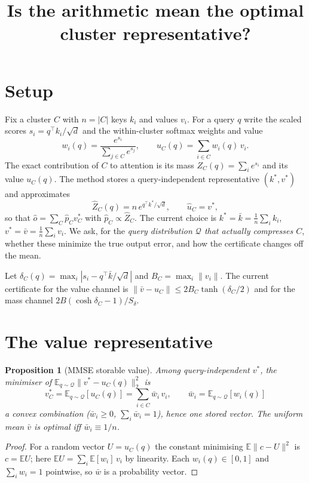 \documentclass[11pt]{article}
\title{Is the arithmetic mean the optimal cluster representative?}
\author{}
\date{}
\newtheorem{proposition}{Proposition}
\begin{document}
\maketitle

\section{Setup}

Fix a cluster $C$ with $n=|C|$ keys $k_i$ and values $v_i$. For a query $q$ write the
scaled scores $s_i = q^\top k_i/\sqrt{d}$ and the within-cluster softmax weights and
value
\[
  w_i(q) = \frac{e^{s_i}}{\sum_{j\in C} e^{s_j}}, \qquad
  u_C(q) = \sum_{i\in C} w_i(q)\, v_i .
\]
The exact contribution of $C$ to attention is its mass $Z_C(q)=\sum_i e^{s_i}$ and its
value $u_C(q)$. The method stores a query-independent representative $(k^\ast,v^\ast)$ and
approximates
\[
  \hat Z_C(q) = n\, e^{q^\top k^\ast/\sqrt d}, \qquad \hat u_C = v^\ast,
\]
so that $\hat o = \sum_C \hat p_C v^\ast_C$ with $\hat p_C \propto \hat Z_C$. The current
choice is $k^\ast=\bar k=\frac1n\sum_i k_i$, $v^\ast=\bar v=\frac1n\sum_i v_i$. We ask,
for the \emph{query distribution $\mathcal Q$ that actually compresses $C$}, whether these
minimize the true output error, and how the certificate changes off the mean.

Let $\delta_C(q) = \max_i |s_i - q^\top\bar k/\sqrt d|$ and $B_C=\max_i\|v_i\|$. The
current certificate for the value channel is $\|\bar v - u_C\|\le 2B_C\tanh(\delta_C/2)$
and for the mass channel $2B(\cosh\delta_C-1)/S_\delta$.

\section{The value representative}

\begin{proposition}[MMSE storable value]\label{prop:value}
Among query-independent $v^\ast$, the minimiser of $\mathbb E_{q\sim\mathcal Q}\|v^\ast-u_C(q)\|_2^2$ is
\[
  \boxed{\;v^\ast_C = \mathbb E_{q\sim\mathcal Q}[u_C(q)] = \sum_{i\in C}\bar w_i\, v_i,\qquad
  \bar w_i = \mathbb E_{q\sim\mathcal Q}[w_i(q)]\;}
\]
a convex combination ($\bar w_i\ge0$, $\sum_i\bar w_i=1$), hence one stored vector. The
uniform mean $\bar v$ is optimal iff $\bar w_i\equiv 1/n$.
\end{proposition}
\begin{proof}
For a random vector $U=u_C(q)$ the constant minimising $\mathbb E\|c-U\|^2$ is
$c=\mathbb E U$; here $\mathbb E U=\sum_i \mathbb E[w_i]\,v_i$ by linearity. Each $w_i(q)\in[0,1]$
and $\sum_i w_i=1$ pointwise, so $\bar w$ is a probability vector.
\end{proof}
\end{document}
